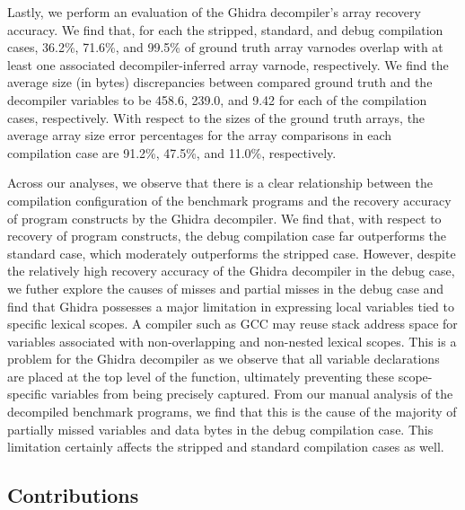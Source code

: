 \documentclass[conference]{IEEEtran}
\begin{document}
Lastly, we perform an evaluation of the Ghidra decompiler's array recovery accuracy. We find that, for each the stripped, standard, and debug compilation cases, 36.2\%, 71.6\%, and 99.5\% of ground truth array varnodes overlap with at least one associated decompiler-inferred array varnode, respectively. We find the average size (in bytes) discrepancies between compared ground truth and the decompiler variables to be 458.6, 239.0, and 9.42 for each of the compilation cases, respectively. With respect to the sizes of the ground truth arrays, the average array size error percentages for the array comparisons in each compilation case are 91.2\%, 47.5\%, and 11.0\%, respectively.

Across our analyses, we observe that there is a clear relationship between the compilation configuration of the benchmark programs and the recovery accuracy of program constructs by the Ghidra decompiler. We find that, with respect to recovery of program constructs, the debug compilation case far outperforms the standard case, which moderately outperforms the stripped case. However, despite the relatively high recovery accuracy of the Ghidra decompiler in the debug case, we futher explore the causes of misses and partial misses in the debug case and find that Ghidra possesses a major limitation in expressing local variables tied to specific lexical scopes. A compiler such as GCC may reuse stack address space for variables associated with non-overlapping and non-nested lexical scopes. This is a problem for the Ghidra decompiler as we observe that all variable declarations are placed at the top level of the function, ultimately preventing these scope-specific variables from being precisely captured. From our manual analysis of the decompiled benchmark programs, we find that this is the cause of the majority of partially missed variables and data bytes in the debug compilation case. This limitation certainly affects the stripped and standard compilation cases as well.

\subsection{Contributions}
\end{document}
